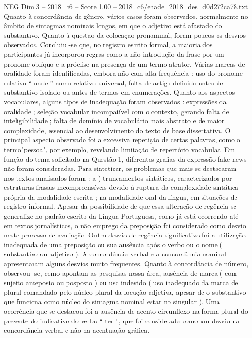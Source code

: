 \begin{textsample}{NEG Dim 3 – 2018\_c6 – Score 1.00 – 2018\_c6/enade\_2018\_des\_d0d272ca78.txt}
Quanto à concordância de gênero, vários casos foram observados, normalmente no âmbito de sintagmas nominais longos, em que o adjetivo está afastado do substantivo.
Quanto à questão da colocação pronominal, foram poucos os desvios observados.
Concluiu -se que, no registro escrito formal, a maioria dos participantes já incorporou regras como a não introdução da frase por um pronome oblíquo e a próclise na presença de um termo atrator.
Várias marcas de oralidade foram identificadas, embora não com alta frequência : uso do pronome relativo “ onde ” como relativo universal, falta de artigo definido antes de substantivo isolado ou antes de termos em enumerações.
Quanto aos aspectos vocabulares, alguns tipos de inadequação foram observados : expressões da oralidade ; seleção vocabular incompatível com o contexto, gerando falta de inteligibilidade ; falta de domínio de vocabulário mais abstrato e de maior complexidade, essencial ao desenvolvimento do texto de base dissertativa.
O principal aspecto observado foi a excessiva repetição de certas palavras, como o termo"pessoa", por exemplo, revelando limitação de repertório vocabular.
Em função do tema solicitado na Questão 1, diferentes grafias da expressão fake news não foram consideradas.
Para sintetizar, os problemas que mais se destacaram nos textos analisados foram : a ) truncamentos sintáticos, caracterizados por estruturas frasais incompreensíveis devido à ruptura da complexidade sintática própria da modalidade escrita ; na modalidade oral da língua, em situações de registro informal.
Apesar da possibilidade de que essa alteração de regência se generalize no padrão escrito da Língua Portuguesa, como já está ocorrendo até em textos jornalísticos, o não emprego da preposição foi considerado como desvio neste processo de avaliação.
Outro desvio de regência significativo foi a utilização inadequada de uma preposição ou sua ausência após o verbo ou o nome ( substantivo ou adjetivo ).
A concordância verbal e a concordância nominal apresentaram alguns desvios muito frequentes.
Quanto à concordância de número, observou -se, como apontam as pesquisas nessa área, ausência de marca ( com sujeito anteposto ou posposto ) ou uso indevido ( uso inadequado da marca de plural comandado pelo núcleo plural da locução adjetiva, apesar de o substantivo que funciona como núcleo do sintagma nominal estar no singular ).
Uma ocorrência que se destacou foi a ausência de acento circunflexo na forma plural do presente do indicativo do verbo “ ter ”, que foi considerada como um desvio na concordância verbal e não na acentuação gráfica.

\end{textsample}
